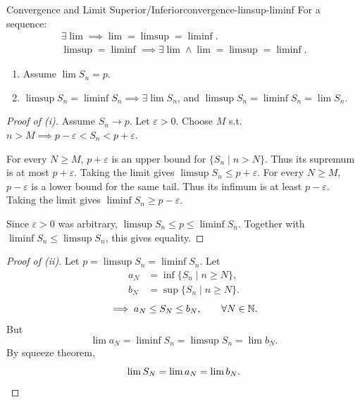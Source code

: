 \begin{theorem}{Convergence and Limit Superior/Inferior}{convergence-limsup-liminf}
  For a sequence:
  \begin{gather*}
    \exists\lim\implies\lim=\limsup=\liminf.\\
    \limsup=\liminf\implies\exists\lim
    \land\lim=\limsup=\liminf.
  \end{gather*}
\end{theorem}

\begin{enumerate}[label=(\roman*), proofparts]
  \item Assume $\lim S_n=p$.
  \item $\limsup S_n=\liminf S_n\implies\exists\lim S_n$,
        and $\limsup S_n=\liminf S_n=\lim S_n$.
\end{enumerate}

\begin{proof}[Proof of (i)]
  Assume $S_n\to p$. Let $\varepsilon>0$.
  Choose $M$ s.t.\ $n>M\implies p-\varepsilon<S_n<p+\varepsilon$.
  \begin{enumerate}[proofsubgoals]
    For every $N\ge M$, $p+\varepsilon$ is an upper bound for $\{S_n\mid n>N\}$.
    Thus its supremum is at most $p+\varepsilon$. Taking the limit gives
    $\limsup S_n\le p+\varepsilon$.
    For every $N\ge M$, $p-\varepsilon$ is a lower bound for the same tail.
    Thus its infimum is at least $p-\varepsilon$. Taking the limit gives
    $\liminf S_n\ge p-\varepsilon$.
  \end{enumerate}
  Since $\varepsilon>0$ was arbitrary, $\limsup S_n\le p\le\liminf S_n$.
  Together with $\liminf S_n\le\limsup S_n$, this gives equality.
\end{proof}

\begin{proof}[Proof of (ii)]
  Let $p=\limsup S_n=\liminf S_n$.
  Let
  \begin{align*}
    a_N & =\inf\{S_n\mid n\ge N\}, \\
    b_N & =\sup\{S_n\mid n\ge N\}.
  \end{align*}
  \[
    \implies a_N\le S_N\le b_N,\qquad\forall N\in\mathbb{N}.
  \]
  But
  \[
    \lim a_N=\liminf S_n=\limsup S_n=\lim b_N.
  \]
  By squeeze theorem,
  \[
    \lim S_N=\lim a_N=\lim b_N.\qedhere
  \]
\end{proof}

